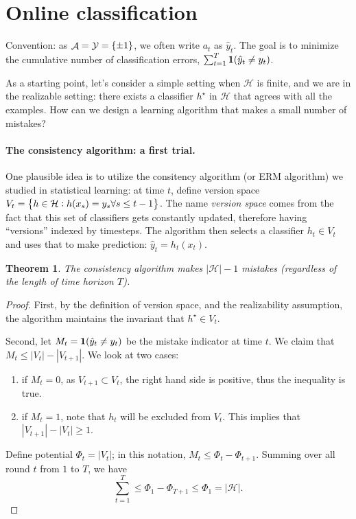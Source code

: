 \documentclass{article}
\newtheorem{theorem}{Theorem}
\DeclareMathOperator*{\Ycal}{{\cal Y}}
\DeclareMathOperator{\Acal}{{\cal A}}
\newcommand{\Hcal}{\mathcal{H}}
\newcommand*{\one}{{\bf 1}}
\begin{document}
\section{Online classification}
Convention: as $\Acal = \Ycal = \cbr{\pm 1}$, we often write $a_t$ as $\hat{y}_t$. The goal is to minimize the cumulative number of classification errors, $\sum_{t=1}^T \one(\hat{y}_t \neq y_t)$.

As a starting point, let's consider a simple setting when $\Hcal$ is finite, and we are in the realizable setting: there exists a classifier $h^\star$ in $\Hcal$ that agrees with all the examples. How can we design a learning algorithm that makes a small number of mistakes?

\paragraph{The consistency algorithm: a first trial.} One plausible idea is to utilize the consitency algorithm (or ERM algorithm) we studied in statistical learning: at time $t$, define version space $V_t = \cbr{h \in \Hcal: h(x_s) = y_s \forall s \leq t-1}$. The name {\em version space} comes from the fact that this set of classifiers gets constantly updated, therefore having ``versions'' indexed by timesteps.
The algorithm then selects a classifier $h_t \in V_t$ and uses that to make prediction: $\hat{y}_t = h_t(x_t)$.

\begin{theorem}
The consistency algorithm makes $|\Hcal| - 1$ mistakes (regardless of the length of time horizon $T$).
\label{thm:cons}
\end{theorem}

\begin{proof}
First, by the definition of version space, and the realizability assumption, the algorithm maintains the invariant that $h^\star \in V_t$.

Second, let $M_t = \one(\hat{y}_t \neq y_t)$  be the mistake indicator at time $t$. We claim that $M_t \leq |V_t| - |V_{t+1}|$. We look at two cases:
\begin{enumerate}
  \item if $M_t = 0$, as $V_{t+1} \subset V_{t}$, the right hand side is positive, thus the inequality is true.
  \item if $M_t = 1$, note that $h_t$ will be excluded from $V_t$. This implies that $|V_{t+1}| - |V_t| \geq 1$.
\end{enumerate}

Define potential $\Phi_t = |V_t|$; in this notation, $M_t \leq \Phi_t - \Phi_{t+1}$. Summing over all round $t$ from $1$ to $T$, we have
\[ \sum_{t=1}^T \leq \Phi_1 - \Phi_{T+1} \leq \Phi_1 = |\Hcal|. \]
\end{proof}
\end{document}
